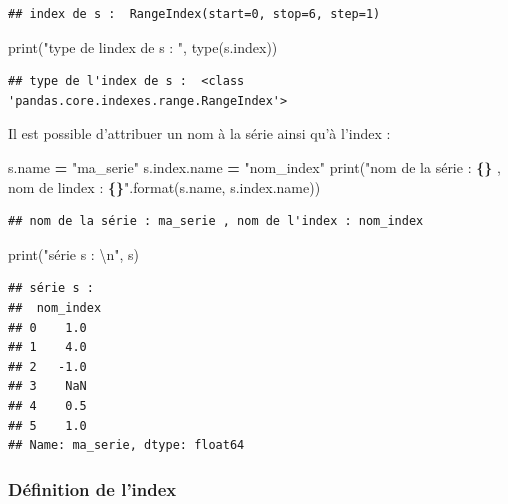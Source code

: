 \documentclass[
  12pt,
]{book}
\newenvironment{Shaded}{\begin{snugshade}}{\end{snugshade}}
\newcommand{\BuiltInTok}[1]{#1}
\newcommand{\CharTok}[1]{\textcolor[rgb]{0.31,0.60,0.02}{#1}}
\newcommand{\NormalTok}[1]{#1}
\newcommand{\OperatorTok}[1]{\textcolor[rgb]{0.81,0.36,0.00}{\textbf{#1}}}
\newcommand{\SpecialCharTok}[1]{\textcolor[rgb]{0.81,0.36,0.00}{\textbf{#1}}}
\newcommand{\StringTok}[1]{\textcolor[rgb]{0.31,0.60,0.02}{#1}}
\numberwithin{equation}{section}
\numberwithin{countremarque}{section}
\begin{document}
\begin{lstlisting}
## index de s :  RangeIndex(start=0, stop=6, step=1)
\end{lstlisting}

\begin{Shaded}
\begin{Highlighting}[]
\BuiltInTok{print}\NormalTok{(}\StringTok{"type de l\textquotesingle{}index de s : "}\NormalTok{, }\BuiltInTok{type}\NormalTok{(s.index))}
\end{Highlighting}
\end{Shaded}

\begin{lstlisting}
## type de l'index de s :  <class 'pandas.core.indexes.range.RangeIndex'>
\end{lstlisting}

Il est possible d'attribuer un nom à la série ainsi qu'à l'index :

\begin{Shaded}
\begin{Highlighting}[]
\NormalTok{s.name }\OperatorTok{=} \StringTok{"ma\_serie"}
\NormalTok{s.index.name }\OperatorTok{=} \StringTok{"nom\_index"}
\BuiltInTok{print}\NormalTok{(}\StringTok{"nom de la série : }\SpecialCharTok{\{\}}\StringTok{ , nom de l\textquotesingle{}index : }\SpecialCharTok{\{\}}\StringTok{"}\NormalTok{.}\BuiltInTok{format}\NormalTok{(s.name, s.index.name))}
\end{Highlighting}
\end{Shaded}

\begin{lstlisting}
## nom de la série : ma_serie , nom de l'index : nom_index
\end{lstlisting}

\begin{Shaded}
\begin{Highlighting}[]
\BuiltInTok{print}\NormalTok{(}\StringTok{"série s : }\CharTok{\textbackslash{}n}\StringTok{"}\NormalTok{, s)}
\end{Highlighting}
\end{Shaded}

\begin{lstlisting}
## série s : 
##  nom_index
## 0    1.0
## 1    4.0
## 2   -1.0
## 3    NaN
## 4    0.5
## 5    1.0
## Name: ma_serie, dtype: float64
\end{lstlisting}

\subsubsection{Définition de l'index}\label{duxe9finition-de-lindex}
\end{document}
